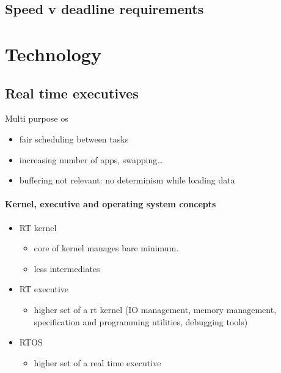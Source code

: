\documentclass[10pt]{article}
\theoremstyle{plain}
\theoremstyle{definition}
\theoremstyle{remark}
\begin{document}
\subsection{Speed v deadline requirements}

\section{Technology}

\subsection{Real time executives}
Multi purpose os
\begin{itemize}
    \item fair scheduling between tasks
    \item increasing number of apps, swapping\dots
    \item buffering not relevant: no determinism while loading data
\end{itemize}

\paragraph{Kernel, executive and operating system concepts}
\begin{itemize}
    \item RT kernel
        \begin{itemize}
            \item core of kernel manages bare minimum.
            \item less intermediates
        \end{itemize}
    \item RT executive
        \begin{itemize}
            \item higher set of a rt kernel (IO management, memory management,
                specification and programming utilities, debugging tools)
        \end{itemize}
    \item RTOS
        \begin{itemize}
            \item higher set of a real time executive
        \end{itemize}
\end{itemize}
\end{document}
